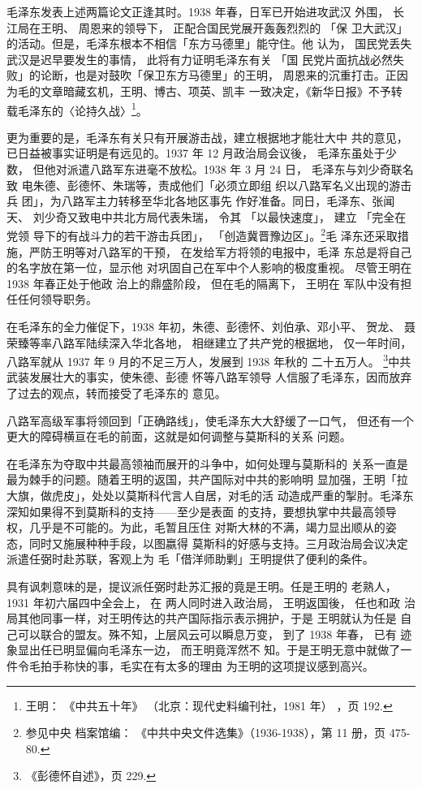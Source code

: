 毛泽东发表上述两篇论文正逢其时。1938 年春，日军已开始进攻武汉 外围， 长
江局在王明、 周恩来的领导下， 正配合国民党展开轰轰烈烈的 「保 卫大武汉」
的活动。但是，毛泽东根本不相信「东方马德里」能守住。他 认为， 国民党丢失
武汉是迟早要发生的事情， 此将有力证明毛泽东有关 「国 民党片面抗战必然失
败」的论断，也是对鼓吹「保卫东方马德里」的王明， 周恩来的沉重打击。正因
为毛的文章暗藏玄机，王明、博古、项英、凯丰 一致决定，《新华日报》不予转
载毛泽东的〈论持久战〉\footnote{王明：
《中共五十年》
（北京：现代史料编刊社，1981 年）
，页 192.}。

更为重要的是，毛泽东有关只有开展游击战，建立根据地才能壮大中 共的意见，
已日益被事实证明是有远见的。1937 年 12 月政治局会议後， 毛泽东虽处于少数，
但他对派遣八路军东进毫不放松。1938 年 3 月 24 日， 毛泽东与刘少奇联名致
电朱德、彭德怀、朱瑞等，责成他们「必须立即组 织以八路军名义出现的游击兵
团」，为八路军主力转移至华北各地区事先 作好准备。同日，毛泽东、张闻天、
刘少奇又致电中共北方局代表朱瑞， 令其 「以最快速度」， 建立 「完全在党领
导下的有战斗力的若干游击兵团」， 「创造冀晋豫边区」。\footnote{参见中央
档案馆编： 《中共中央文件选集》（1936-1938），第 11 册，页 475-80.}毛
泽东还采取措施，严防王明等对八路军的干预， 在发给军方将领的电报中，毛泽
东总是将自己的名字放在第一位，显示他 对巩固自己在军中个人影响的极度重视。
尽管王明在 1938 年春正处于他政 治上的鼎盛阶段， 但在毛的隔离下， 王明在
军队中没有担任任何领导职务。

在毛泽东的全力催促下，1938 年初，朱德、彭德怀、刘伯承、邓小平、 贺龙、
聂荣臻等率八路军陆续深入华北各地， 相继建立了共产党的根据地， 仅一年时间，
八路军就从 1937 年 9 月的不足三万人，发展到 1938 年秋的 二十五万人。
\footnote{《彭德怀自述》，页 229.}中共武装发展壮大的事实，使朱德、彭德
怀等八路军领导 人信服了毛泽东，因而放弃了过去的观点，转而接受了毛泽东的
意见。

八路军高级军事将领回到「正确路线」，使毛泽东大大舒缓了一口气，
但还有一个更大的障碍横亘在毛的前面，这就是如何调整与莫斯科的关系
问题。

在毛泽东为夺取中共最高领袖而展开的斗争中，如何处理与莫斯科的
关系一直是最为棘手的问题。随着王明的返国，共产国际对中共的影响明
显加强，王明「拉大旗，做虎皮」，处处以莫斯科代言人自居，对毛的活
动造成严重的掣肘。毛泽东深知如果得不到莫斯科的支持——至少是表面
的支持，要想执掌中共最高领导权，几乎是不可能的。为此，毛暂且压住
对斯大林的不满，竭力显出顺从的姿态，同时又施展种种手段，以图嬴得
莫斯科的好感与支持。三月政治局会议决定派遣任弼时赴苏联，客观上为
毛「借洋师助剿」王明提供了便利的条件。

具有讽刺意味的是，提议派任弼时赴苏汇报的竟是王明。任是王明的 老熟人，
1931 年初六届四中全会上， 在 两人同时进入政治局， 王明返国後， 任也和政
治局其他同事一样，对王明传达的共产国际指示表示拥护，于是 王明就认为任是
自己可以联合的盟友。殊不知，上层风云可以瞬息万变， 到了 1938 年春， 已有
迹象显出任已明显偏向毛泽东一边， 而王明竟浑然不
知。于是王明无意中就做了一件令毛拍手称快的事，毛实在有太多的理由
为王明的这项提议感到高兴。
 
